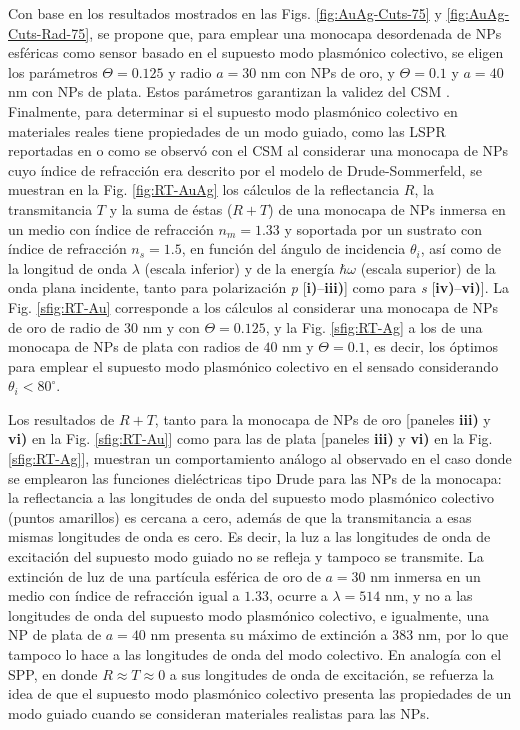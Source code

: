 Con base en los resultados mostrados en las Figs. \ref{fig:AuAg-Cuts-75} y \ref{fig:AuAg-Cuts-Rad-75}, se propone que, para emplear una monocapa desordenada de NPs esféricas como sensor basado en el supuesto modo plasmónico colectivo, se eligen los parámetros $\Theta=0.125$ y radio $a=30$ nm con NPs de oro, y $\Theta=0.1$ y $a=40$ nm con NPs de plata. Estos parámetros garantizan la validez del CSM \cite{garcia2012multiple}. Finalmente, para determinar si el supuesto modo plasmónico colectivo en materiales reales tiene propiedades de un modo guiado, como las LSPR reportadas en \cite{kabashin2009plasmonic} o como se observó con el CSM al considerar una monocapa de NPs cuyo índice de refracción era descrito por el modelo de Drude-Sommerfeld, se  muestran en la Fig. \ref{fig:RT-AuAg}  los cálculos de la reflectancia $R$, la transmitancia $T$ y la suma de éstas ($R+T$) de una monocapa de NPs inmersa en un medio con índice de refracción $n_m=1.33$ y soportada por un sustrato con índice de refracción $n_s=1.5$, en función del ángulo de incidencia $\theta_i$, así como de la longitud de onda $\lambda$ (escala inferior) y de la energía  $\hbar\omega$ (escala superior) de la onda plana incidente, tanto para polarización \emph{p}  [\textbf{i)}--\textbf{iii)}] como para \emph{s} [\textbf{iv)}--\textbf{vi)}]. La Fig. \ref{sfig:RT-Au} corresponde a los cálculos al considerar una monocapa de NPs de oro de radio de $30$ nm y con $\Theta=0.125$, y la  Fig. \ref{sfig:RT-Ag} a los de una monocapa de NPs de plata con radios de $40$ nm y $\Theta=0.1$, es decir, los óptimos para emplear el supuesto modo plasmónico colectivo en el sensado considerando $\theta_i<80^\circ$.

Los resultados de $R+T$, tanto para la monocapa de NPs de oro [paneles \textbf{iii)} y \textbf{vi)} en la Fig. \ref{sfig:RT-Au}] como para las de plata [paneles \textbf{iii)} y \textbf{vi)} en la Fig. \ref{sfig:RT-Ag}], muestran un comportamiento análogo al observado en el caso donde se emplearon las funciones dieléctricas tipo Drude para las NPs de la monocapa: la reflectancia a las longitudes de onda del supuesto modo plasmónico colectivo (puntos amarillos) es cercana a cero, además de que la transmitancia a esas mismas longitudes de onda es cero. Es decir, la luz a las longitudes de onda de excitación del supuesto modo guiado no se refleja y tampoco se transmite. La extinción de luz de una partícula esférica de oro de $a=30$ nm inmersa en un medio con índice de refracción igual a $1.33$, ocurre a $\lambda= 514$ nm, y no a las longitudes de onda del supuesto modo plasmónico colectivo, e igualmente, una NP de plata de $a=40$ nm presenta su máximo de extinción a $383$ nm, por lo que tampoco lo hace a las longitudes de onda del modo colectivo. En analogía con el SPP, en donde $R\approx T\approx 0$ a sus longitudes de onda de excitación, se refuerza la idea de que el supuesto modo plasmónico colectivo presenta las propiedades de un modo guiado cuando se consideran materiales realistas para las NPs.

